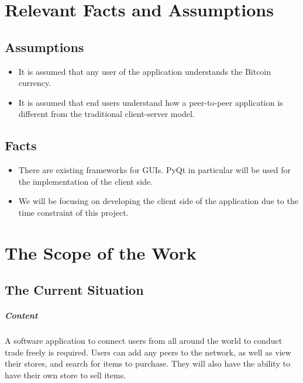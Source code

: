 \documentclass{article}
\begin{document}
\section{Relevant Facts and Assumptions}


\subsection{Assumptions}
\begin{itemize}
	
\item
It is assumed that any user of the application understands the Bitcoin currency.

\item
It is assumed that end users understand how a peer-to-peer application is different from the traditional client-server model.
\end{itemize}

\subsection{Facts}
\begin{itemize}
	
\item
There are existing frameworks for GUIs. PyQt in particular will be used for the implementation of the client side. 
\item
We will be focusing on developing the client side of the application due to the time constraint of this project.
	
\end{itemize} 

\section{The Scope of the Work}
\subsection{The Current Situation}
\subparagraph{Content}
A software application to connect users from all around the world to conduct trade freely is required. Users can add any peers to the network, as well as view their stores, and search for items to purchase. They will also have the ability to have their own store to sell items.
\end{document}
